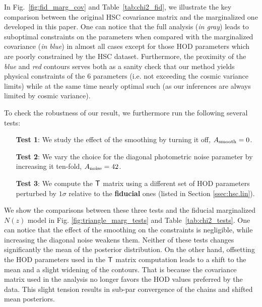 \documentclass[a4paper,11pt]{article}
\begin{document}
In Fig.~\ref{fig:fid_marg_cov} and Table~\ref{tab:chi2_fid},
we illustrate the key  comparison between the original HSC
covariance matrix and the marginalized
one developed in this paper. One can
notice that the full analysis (\textit{in gray}) leads to 
suboptimal constraints on the parameters
when compared with the marginalized
covariance (\textit{in blue}) in almost all cases
except for those HOD parameters which are poorly
constrained by the HSC dataset. 
Furthermore, the proximity
of the \textit{blue} and \textit{red} 
contours serves both as a sanity check 
that our method yields physical constraints
of the 6 parameters (i.e. not exceeding
the cosmic variance limits) while at the same time 
nearly optimal such (as 
our inferences are always limited
by cosmic variance).

To check the robustness of our result, we furthermore
run the following several tests:
\begin{itemize}
\item[\textbf{Test 1}:] We study the effect of the smoothing
by turning it off, $A_{\rm smooth} = 0$. 
\item[\textbf{Test 2}:] We vary the choice for the
diagonal photometric noise parameter
by increasing it ten-fold, $A_{\rm noise} = 42$.
\item[\textbf{Test 3}:] We compute the ${\sf T}$ matrix 
using a different set of 
HOD parameters perturbed by $1\sigma$
relative to the \textbf{fiducial} ones (listed in Section \ref{ssec:hsc.lin}).
\end{itemize}
We show the comparisons between
these three tests and the
fiducial marginalized $N(z)$ model in Fig.
\ref{fig:triangle_marg_tests} and Table~\ref{tab:chi2_tests}.
One can notice that the effect of the
smoothing on the constraints is negligible,
while increasing the diagonal noise
weakens them. Neither of these
tests changes significantly the
mean of the posterior distribution.
On the other hand, offsetting the 
HOD parameters used in the ${\sf T}$
matrix computation leads to a shift to
the mean and a slight widening of the
contours. That is because the covariance
matrix used in the analysis no longer
favors the HOD values preferred by the
data. This slight tension
results in sub-par convergence
of the chains and shifted mean posteriors.
\end{document}
